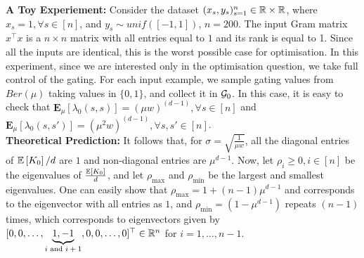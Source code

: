 \textbf{A Toy Experiement:} Consider the dataset $(x_s,y_s)_{s=1}^n\in \mathbb{R}\times \mathbb{R}$, where $x_s=1,\forall s\in [n]$, and $y_s\sim unif([-1,1])$, $n=200$. The input Gram matrix $x^\top x$ is a $n\times n$ matrix with all entries equal to $1$ and its rank is equal to 1. Since all the inputs are identical, this is the worst possible case for optimisation. In this experiment, since we are interested only in the optimisation question, we take full control of the gating. For each input example, we sample gating values from $Ber(\mu)$ taking values in $\{0,1\}$, and collect it in $\mathcal{G}_0$. In this case, it is easy to check that $\mathbf{E}_{\mu}\left[\lambda_0(s,s)\right]=(\mu w)^{(d-1)},\forall s\in[n]$ and $\mathbf{E}_{\mu}\left[\lambda_0(s,s')\right]=(\mu^2 w)^{(d-1)},\forall s,s'\in[n]$.\hfill\\
\textbf{Theoretical Prediction:} It follows that,  for $\sigma=\sqrt{\frac{1}{\mu w}}$, all the diagonal entries of $\mathbb{E}\left[K_0\right]/d$ are $1$ and non-diagonal entries are $\mu^{d-1}$. Now, let $\rho_i\geq 0,i \in [n]$ be the eigenvalues of $\frac{\mathbb{E}\left[K_0\right]}{d}$, and let $\rho_{\max}$ and $\rho_{\min}$ be the largest and smallest eigenvalues.  One can easily show that $\rho_{\max}=1+(n-1)\mu^{d-1}$ and corresponds to the eigenvector with all entries as $1$, and $\rho_{\min}=(1-\mu^{d-1})$ repeats $(n-1)$ times, which corresponds to eigenvectors given by $[0, 0, \ldots, \underbrace{1, -1}_{\text{$i$ and $i+1$}}, 0,0,\ldots, 0]^\top \in \mathbb{R}^n$ for $i=1,\ldots,n-1$.\hfill\\
